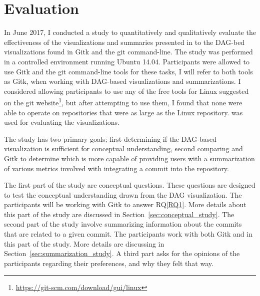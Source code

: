 \chapter{Evaluation}

In June 2017, I conducted a study to quantitatively and qualitatively
evaluate the effectiveness of the visualizations and summaries presented
in \tool{} to the DAG-bed visualizations found in Gitk and the git
command-line. The study was performed in a controlled environment
running Ubuntu 14.04. Participants were allowed to use Gitk and the git
command-line tools for these tasks, I will refer to both tools as Gitk,
when working with DAG-based visualizations and summarizations. I
considered allowing participants to use any of the free tools for Linux
suggested on the git
website\footnote{\url{https://git-scm.com/download/gui/linux}}, but
after attempting to use them, I found that none were able to operate on
repositories that were as large as the Linux repository. \tool{} was
used for evaluating the  visualizations.

The study has two primary goals; first determining if the DAG-based
visualization is sufficient for conceptual understanding, second
comparing \tool and Gitk to determine which is more capable of providing
users with a summarization of various metrics involved with integrating
a commit into the repository.

The first part of the study are conceptual questions. These questions
are designed to test the conceptual understanding drawn from the DAG
visualization. The participants will be working with Gitk to answer
RQ\ref{RQ1}. More details about this part of the study are discussed in
Section~\ref{sec:conceptual_study}. The second part of the study involve
summarizing information about the commits that are related to a given
commit. The participants work with both Gitk and \tool{} in this part of
the study. More details are discussing in
Section~\ref{sec:summarization_study}. A third part asks for the
opinions of the participants regarding their preferences, and why they
felt that way.
